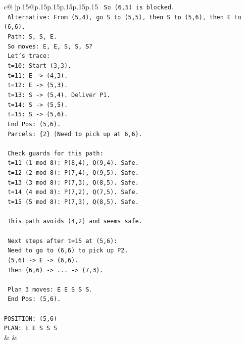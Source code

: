\documentclass{article}
\begin{document}
{\begin{supertabular}{c@{$\;$}|p{.15\linewidth}@{}p{.15\linewidth}p{.15\linewidth}p{.15\linewidth}p{.15\linewidth}p{.15\linewidth}}
{{{\texttt{         So (6,5) is blocked.} \\
\texttt{         Alternative: From (5,4), go S to (5,5), then S to (5,6), then E to (6,6).} \\
\texttt{         Path: S, S, E.} \\
\texttt{         So moves: E, E, S, S, S?} \\
\texttt{         Let's trace:} \\
\texttt{         t=10: Start (3,3).} \\
\texttt{         t=11: E {-}> (4,3).} \\
\texttt{         t=12: E {-}> (5,3).} \\
\texttt{         t=13: S {-}> (5,4). Deliver P1.} \\
\texttt{         t=14: S {-}> (5,5).} \\
\texttt{         t=15: S {-}> (5,6).} \\
\texttt{         End Pos: (5,6).} \\
\texttt{         Parcels: \{2\} (Need to pick up at 6,6).} \\
\\ 
\texttt{      Check guards for this path:} \\
\texttt{      t=11 (1 mod 8): P(8,4), Q(9,4). Safe.} \\
\texttt{      t=12 (2 mod 8): P(7,4), Q(9,5). Safe.} \\
\texttt{      t=13 (3 mod 8): P(7,3), Q(8,5). Safe.} \\
\texttt{      t=14 (4 mod 8): P(7,2), Q(7,5). Safe.} \\
\texttt{      t=15 (5 mod 8): P(7,3), Q(8,5). Safe.} \\
\\ 
\texttt{      This path avoids (4,2) and seems safe.} \\
\\ 
\texttt{      Next steps after t=15 at (5,6):} \\
\texttt{      Need to go to (6,6) to pick up P2.} \\
\texttt{      (5,6) {-}> E {-}> (6,6).} \\
\texttt{      Then (6,6) {-}> ... {-}> (7,3).} \\
\\ 
\texttt{      Plan 3 moves: E E S S S.} \\
\texttt{      End Pos: (5,6).} \\
\\ 
\texttt{POSITION: (5,6)} \\
\texttt{PLAN: E E S S S} \\
            }
        }
    }
    & & \\ \\


\end{supertabular}}
\end{document}
